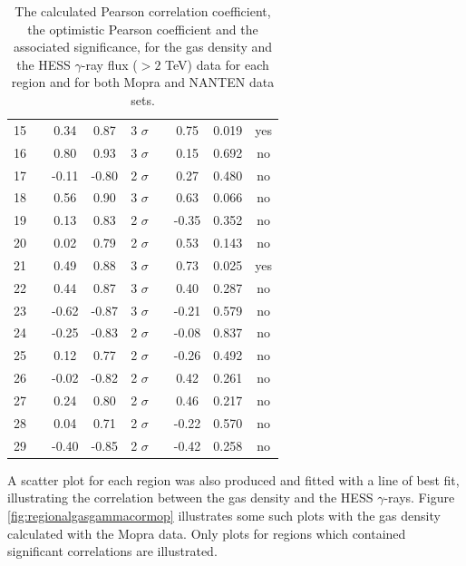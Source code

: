 \documentclass[12pt,a4paper]{article}
\begin{document}
\begin{table}[H]
\begin{tabular}{ccccccccc}
		15 && 0.34 & 0.87 & 3 $\sigma$ && 0.75 & 0.019 & yes \\
		16 && 0.80 & 0.93 & 3 $\sigma$ && 0.15 & 0.692 & no \\ 
		17 && -0.11 & -0.80 & 2 $\sigma$ && 0.27 & 0.480 & no \\
		18 && 0.56 & 0.90 & 3 $\sigma$ && 0.63 & 0.066 & no \\
		19 && 0.13 & 0.83 & 2 $\sigma$ && -0.35 & 0.352 & no \\
		20 && 0.02 & 0.79 & 2 $\sigma$ && 0.53 & 0.143 & no \\
		21 && 0.49 & 0.88 & 3 $\sigma$ && 0.73 & 0.025 & yes \\
		22 && 0.44 & 0.87 & 3 $\sigma$ && 0.40 & 0.287 & no \\
		23 && -0.62 & -0.87 & 3 $\sigma$ && -0.21 & 0.579 & no \\
		24 && -0.25 & -0.83 & 2 $\sigma$ && -0.08 & 0.837 & no \\
		25 && 0.12 & 0.77 & 2 $\sigma$ && -0.26 & 0.492 & no \\
		26 && -0.02 & -0.82 & 2 $\sigma$ && 0.42 & 0.261 & no \\ 
		27 && 0.24 & 0.80 & 2 $\sigma$ && 0.46 & 0.217 & no \\
		28 && 0.04 & 0.71 & 2 $\sigma$ && -0.22 & 0.570 & no \\
		29 && -0.40 & -0.85 & 2 $\sigma$ && -0.42 & 0.258 & no \\
		\hline 
	\end{tabular} 
	\caption{The calculated Pearson correlation coefficient, the optimistic Pearson coefficient and the associated significance, for the gas density and the HESS $\gamma$-ray flux ($> 2$ TeV) data for each region and for both Mopra and NANTEN data sets.}
	\label{tab:gasgammacor}
\end{table}
A scatter plot for each region was also produced and fitted with a line of best fit, illustrating the correlation between the gas density and the HESS $\gamma$-rays. Figure \ref{fig:regionalgasgammacormop} illustrates some such plots with the gas density calculated with the Mopra data. Only plots for regions which contained significant correlations are illustrated.
\end{document}
